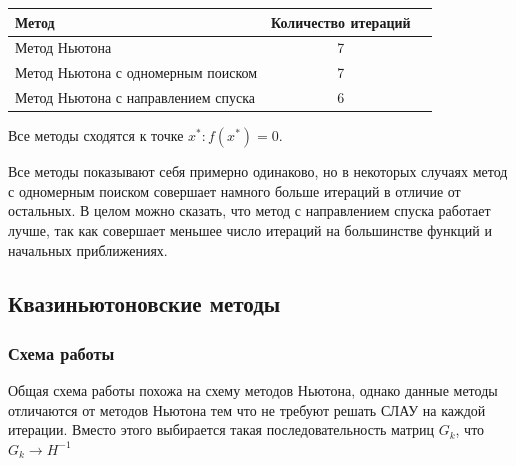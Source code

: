 \documentclass[english]{article}
\begin{document}
\begin{center}
  \begin{longtable}{l|cc}
    Метод & Количество итераций \\
    \hline
    Метод Ньютона & 7 \\
    \hline
    Метод Ньютона с одномерным поиском & 7 \\
    \hline
    Метод Ньютона с направлением спуска &  6 \\
  \end{longtable}
\end{center}
Все методы сходятся к точке \(x^*: f(x^*) = 0\).

Все методы показывают себя примерно одинаково, но в некоторых случаях
метод с одномерным поиском совершает намного больше итераций в отличие
от остальных. В целом можно сказать, что метод с направлением спуска
работает лучше, так как совершает меньшее число итераций на
большинстве функций и начальных приближениях.
\subsection{Квазиньютоновские методы}
\subsubsection{Схема работы}
Общая схема работы похожа на схему методов Ньютона, однако данные
методы отличаются от методов Ньютона тем что не требуют решать СЛАУ на
каждой итерации. Вместо этого выбирается такая последовательность
матриц \(G_k\), что \(G_k \to H^{-1}\)
\end{document}
